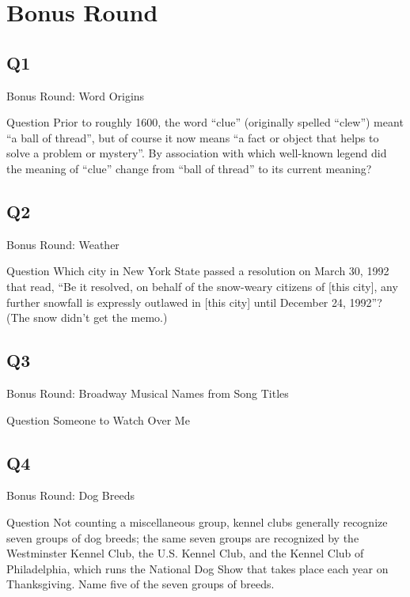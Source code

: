 \documentclass[11pt]{beamer}
\begin{document}
\section{Bonus Round}
\subsection*{Q1}
\begin{frame}[t]{Bonus Round: Word Origins}
\begin{block}{Question}
Prior to roughly 1600, the word ``clue'' (originally spelled ``clew'') meant ``a ball of thread'', but of course it now means ``a fact or object that helps to solve a problem or mystery''. By association with which well-known legend did the meaning of ``clue'' change from ``ball of thread'' to its current meaning?
\end{block}
\end{frame}
\subsection*{Q2}
\begin{frame}[t]{Bonus Round: Weather}
\begin{block}{Question}
Which city in New York State passed a resolution on March 30, 1992 that read, ``Be it resolved, on behalf of the snow-weary citizens of [this city], any further snowfall is expressly outlawed in [this city] until December 24, 1992''? (The snow didn't get the memo.)
\end{block}
\end{frame}
\subsection*{Q3}
\begin{frame}[t]{Bonus Round: Broadway Musical Names from Song Titles}
\begin{block}{Question}
Someone to Watch Over Me
\end{block}
\end{frame}
\subsection*{Q4}
\begin{frame}[t]{Bonus Round: Dog Breeds}
\begin{block}{Question}
Not counting a miscellaneous group, kennel clubs generally recognize seven groups of dog breeds; the same seven groups are recognized by the Westminster Kennel Club, the U.S. Kennel Club, and the Kennel Club of Philadelphia, which runs the National Dog Show that takes place each year on Thanksgiving. Name five of the seven groups of breeds.
\end{block}
\end{frame}
\end{document}
